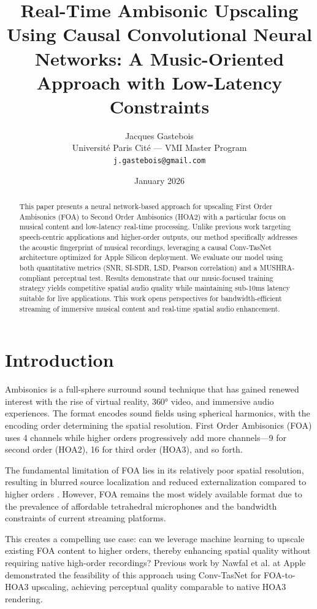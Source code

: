 \documentclass[10pt,twocolumn]{article}
\title{\textbf{Real-Time Ambisonic Upscaling Using Causal Convolutional Neural Networks: A Music-Oriented Approach with Low-Latency Constraints}}
\author{Jacques Gastebois\\
\small Université Paris Cité --- VMI Master Program\\
\small \texttt{j.gastebois@gmail.com}}
\date{January 2026}
\begin{document}
\maketitle

\begin{abstract}
This paper presents a neural network-based approach for upscaling First Order Ambisonics (FOA) to Second Order Ambisonics (HOA2) with a particular focus on musical content and low-latency real-time processing. Unlike previous work targeting speech-centric applications and higher-order outputs, our method specifically addresses the acoustic fingerprint of musical recordings, leveraging a causal Conv-TasNet architecture optimized for Apple Silicon deployment. We evaluate our model using both quantitative metrics (SNR, SI-SDR, LSD, Pearson correlation) and a MUSHRA-compliant perceptual test. Results demonstrate that our music-focused training strategy yields competitive spatial audio quality while maintaining sub-10ms latency suitable for live applications. This work opens perspectives for bandwidth-efficient streaming of immersive musical content and real-time spatial audio enhancement.
\end{abstract}

\section{Introduction}

Ambisonics is a full-sphere surround sound technique that has gained renewed interest with the rise of virtual reality, 360° video, and immersive audio experiences. The format encodes sound fields using spherical harmonics, with the encoding order determining the spatial resolution. First Order Ambisonics (FOA) uses 4 channels while higher orders progressively add more channels---9 for second order (HOA2), 16 for third order (HOA3), and so forth.

The fundamental limitation of FOA lies in its relatively poor spatial resolution, resulting in blurred source localization and reduced externalization compared to higher orders \cite{zotter2019ambisonics}. However, FOA remains the most widely available format due to the prevalence of affordable tetrahedral microphones and the bandwidth constraints of current streaming platforms.

This creates a compelling use case: can we leverage machine learning to upscale existing FOA content to higher orders, thereby enhancing spatial quality without requiring native high-order recordings? Previous work by Nawfal et al. \cite{nawfal2025ambisonics} at Apple demonstrated the feasibility of this approach using Conv-TasNet for FOA-to-HOA3 upscaling, achieving perceptual quality comparable to native HOA3 rendering.
\end{document}
